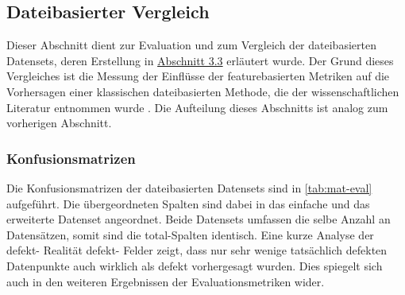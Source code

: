 
\subsection{Dateibasierter Vergleich}
\label{classic-eval}

Dieser Abschnitt dient zur Evaluation und zum Vergleich der dateibasierten Datensets, deren Erstellung in \hyperref[new-datasets]{Abschnitt 3.3} erläutert wurde. Der Grund dieses Vergleiches ist die Messung der Einflüsse der featurebasierten Metriken auf die Vorhersagen einer klassischen dateibasierten Methode, die der wissenschaftlichen Literatur entnommen wurde \cite{Moser2008}. Die Aufteilung dieses Abschnitts ist analog zum vorherigen Abschnitt.

\subsubsection*{Konfusionsmatrizen}

Die Konfusionsmatrizen der dateibasierten Datensets sind in \autoref{tab:mat-eval} aufgeführt. Die übergeordneten Spalten sind dabei in das \glqq einfache\grqq{} und das erweiterte Datenset angeordnet. Beide Datensets umfassen die selbe Anzahl an Datensätzen, somit sind die \glqq total\grqq -Spalten identisch.
Eine kurze Analyse der \glqq defekt\grqq - \glqq Realität defekt\grqq - Felder zeigt, dass nur sehr wenige tatsächlich defekten Datenpunkte auch wirklich als defekt vorhergesagt wurden. Dies spiegelt sich auch in den weiteren Ergebnissen der Evaluationsmetriken wider.

